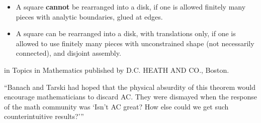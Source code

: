 \begin{itemize}

\item  A square {\bf cannot} be rearranged into a disk, if one is allowed
 finitely many pieces with analytic boundaries, glued at edges.
\item A square can be rearranged into a disk, with translations only,
 if one is allowed to use finitely many pieces with unconstrained
 shape (not necessarily connected), and disjoint assembly. 

\end{itemize}

        \Ref

        {in Topics in Mathematics published by D.C. HEATH AND CO., Boston.}{}


        ``Banach and Tarski had hoped that the physical absurdity of this
        theorem would encourage mathematicians to discard AC. They were
        dismayed when the response of the math community was `Isn't AC great?
        How else could we get such counterintuitive results?'{}''

